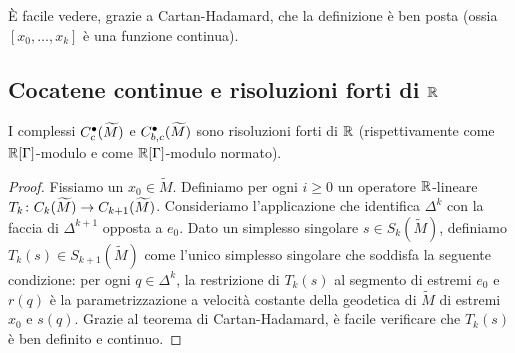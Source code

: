 È facile vedere, grazie a Cartan-Hadamard, che la definizione è ben posta (ossia $[x_0,\ldots,x_k]$ è una funzione continua).

\subsection{Cocatene continue e risoluzioni forti di $\mathbb{R}$}

\begin{proposition}
I complessi $C^\bullet_c(\widetilde M)$ e $C^\bullet_{b,c}(\widetilde M)$ sono risoluzioni  forti di $\mathbb{R}$ (rispettivamente come $\mathbb{R}[\Gamma]$-modulo e come $\mathbb{R}[\Gamma]$-modulo normato).
\end{proposition}
\begin{proof}
Fissiamo un $x_0\in\widetilde M$. Definiamo per ogni $i\ge 0$ un operatore $\mathbb{R}$-lineare $\map{T_k}{C_k(\widetilde M)}{C_{k+1}(\widetilde M)}$. Consideriamo l'applicazione
che identifica $\Delta^k$ con la faccia di $\Delta^{k+1}$ opposta a $e_0$. Dato un simplesso singolare $s\in S_k(\widetilde M)$, definiamo $T_k(s)\in S_{k+1}(\widetilde M)$ come l'unico simplesso singolare che soddisfa la seguente condizione: per ogni $q\in\Delta^k$, la restrizione di $T_k(s)$ al segmento di estremi $e_0$ e $r(q)$ è la parametrizzazione a velocità costante della geodetica di $\widetilde M$ di estremi $x_0$ e $s(q)$. Grazie al teorema di Cartan-Hadamard, è facile verificare che $T_k(s)$ è ben definito e continuo.
\end{proof}
